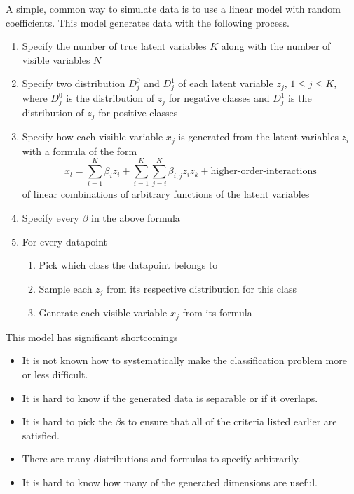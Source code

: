 \documentclass{article}
\begin{document}
A simple, common way to simulate data is to use a linear model with random
coefficients. This model generates data with the following process.
\begin{enumerate}
    \item Specify the number of true latent variables $K$ along with the number
        of visible variables $N$
    \item Specify two distribution $D_j^0$ and $D_j^1$ of each latent variable
        $z_j$, $1 \leq j \leq K$, where $D_j^0$ is the distribution of $z_j$
        for negative classes and $D_j^1$ is the distribution of $z_j$ for
        positive classes
    \item Specify how each visible variable $x_j$ is generated from the latent
        variables $z_i$ with a formula of the form
        $$
        x_l
        = \sum_{i=1}^K \beta_i z_i
        + \sum_{i=1}^K\sum_{j=i}^K \beta_{i,j} z_i z_k
        + \text{higher-order-interactions}
        $$
        of linear combinations of arbitrary functions of the latent variables
    \item Specify every $\beta$ in the above formula
    \item For every datapoint
    \begin{enumerate}
        \item Pick which class the datapoint belongs to
        \item Sample each $z_j$ from its respective distribution for this class
        \item Generate each visible variable $x_j$ from its formula
    \end{enumerate}
\end{enumerate}

This model has significant shortcomings
\begin{itemize}
    \item It is not known how to systematically make the classification problem
        more or less difficult.
    \item It is hard to know if the generated data is separable or if it overlaps.
    \item It is hard to pick the $\beta$s to ensure that all of the criteria
        listed earlier are satisfied.
    \item There are many distributions and formulas to specify arbitrarily.
    \item It is hard to know how many of the generated dimensions are useful.
\end{itemize}
\end{document}
